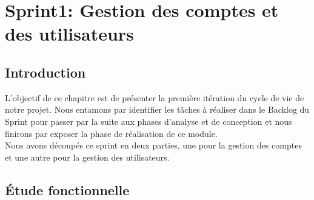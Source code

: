 \chapter{Sprint1: Gestion des comptes et des utilisateurs}
\section {Introduction}
L'objectif de ce chapitre est de présenter la première itération du cycle de vie de notre
projet. Nous entamons par identifier les tâches à réaliser dans le Backlog du Sprint pour
passer par la suite aux phases d'analyse et de conception et nous finirons par exposer la phase de
réalisation de ce module.\\
Nous avons découpés ce sprint en deux parties, une pour la gestion des comptes et une autre pour la gestion des utilisateurs.
\section{Étude fonctionnelle} 
